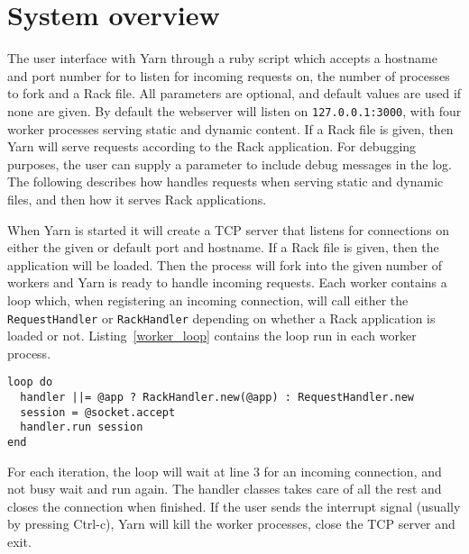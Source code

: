 \section{System overview}

The user interface with Yarn through a ruby script which accepts a
hostname and port number for to listen for incoming requests on, the number
of processes to fork and a Rack file. All parameters are optional, and default
values are used if none are given. By default the webserver will listen on
\texttt{127.0.0.1:3000}, with four worker processes serving static and dynamic
content. If a Rack file is given, then Yarn will serve requests according to
the Rack application. For debugging purposes, the user can supply a parameter
to include debug messages in the log. The following describes how handles
requests when serving static and dynamic files, and then how it serves Rack
applications.

When Yarn is started it will create a TCP server that listens for connections
on either the given or default port and hostname. If a Rack file is given,
then the application will be loaded. Then the process will fork into the given
number of workers and Yarn is ready to handle incoming requests. Each worker
contains a loop which, when registering an incoming connection, will call
either the \texttt{RequestHandler} or \texttt{RackHandler} depending on
whether a Rack application is loaded or not. Listing~\ref{worker_loop}
contains the loop run in each worker process.

\bigskip
\begin{lstlisting}[label=worker_loop,caption=Worker loop
(lib/yarn/server.rb:53)]
loop do
  handler ||= @app ? RackHandler.new(@app) : RequestHandler.new
  session = @socket.accept
  handler.run session 
end
\end{lstlisting}

For each iteration, the loop will wait at line 3 for an incoming connection,
and not busy wait and run again. The handler classes takes care of all the
rest and closes the connection when finished. If the user sends
the interrupt signal (usually by pressing Ctrl-c), Yarn will kill the worker
processes, close the TCP server and exit.
